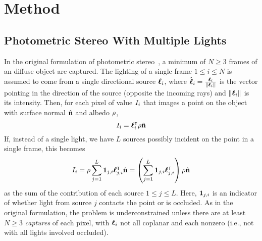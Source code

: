 \section{Method}\label{sec:technical}
\subsection{Photometric Stereo With Multiple Lights}
In the original formulation of photometric stereo~\cite{woodham1979}, a minimum
of $N \ge 3$ frames of an diffuse object are captured. The lighting of a single
frame $1 \le i \le N$ is assumed to come from a single directional source
$\boldsymbol{\ell}_i$, where $\hat{\boldsymbol{\ell}}_i = \frac{\boldsymbol{\ell}_i}{\|\boldsymbol{\ell}_i\|}$ is the
vector pointing in the direction of the source (opposite the incoming rays) and
$\|\boldsymbol{\ell}_i\|$ is its intensity. Then, for each pixel of value $I_i$ that
images a point on the object with surface normal $\hat{\mathbf{n}}$ and albedo
$\rho$,
\begin{equation}
  I_i = \boldsymbol{\ell}_i^\intercal \rho \hat{\mathbf{n}}
\end{equation}
If, instead of a single light, we have $L$ sources possibly incident on the
point in a single frame, this becomes
\begin{equation} \label{eq:photometric-stereo}
  I_i = \rho \sum_{j = 1}^L \mathbf{1}_{j, i} \boldsymbol{\ell}_{j, i}^\intercal \hat{\mathbf{n}}
           = \left(\sum_{j = 1}^L \mathbf{1}_{j, i} \boldsymbol{\ell}_{j, i}^\intercal\right) \rho \hat{\mathbf{n}}
\end{equation}
as the sum of the contribution of each source $1 \le j \le L$. Here,
$\mathbf{1}_{j, i}$ is an indicator of whether light from source $j$ contacts
the point or is occluded. As in the original formulation, the problem is
underconstrained unless there are at least $N \ge 3$ \emph{captures} of each
pixel, with $\boldsymbol{\ell}_i$ not all coplanar and each nonzero (i.e., not with all
lights involved occluded). 

